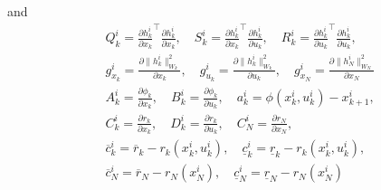 \documentclass{article}
\newcommand{\norm}[1]{\lVert#1\rVert}
\begin{document}
and
\begin{equation}\label{QP data}
\begin{aligned}
&Q_k^i = \frac{\partial h_k^i}{\partial x_k}^\top \frac{\partial h_k^i}{\partial x_k},\quad S_k^i = \frac{\partial h_k^i}{\partial x_k}^\top \frac{\partial h_k^i}{\partial u_k},\quad R_k^i = \frac{\partial h_k^i}{\partial u_k}^\top \frac{\partial h_k^i}{\partial u_k},\\
&g_{x_k}^i = \frac{\partial \norm{h_k^i}_{W_k}^2}{\partial x_k},\quad g_{u_k}^i = \frac{\partial \norm{h_k^i}_{W_k}^2}{\partial u_k},\quad g_{x_N}^i = \frac{\partial \norm{h_N^i}_{W_N}^2}{\partial x_N}\\
&A_k^i=\frac{\partial \phi_k}{\partial x_k}, \quad B_k^i=\frac{\partial \phi_k}{\partial u_k},\quad a_k^i = \phi(x_k^i,u_k^i)-x_{k+1}^i,\\
&C_k^i=\frac{\partial r_k}{\partial x_k}, \quad D_k^i=\frac{\partial r_k}{\partial u_k},\quad C_N^i=\frac{\partial r_N}{\partial x_N},\\
&\overline{c}_k^i=\overline{r}_k-r_k(x_k^i,u_k^i),\quad  \underline{c}_k^i=\underline{r}_k-r_k(x_k^i,u_k^i),\\
&\overline{c}_N^i=\overline{r}_N-r_N(x_N^i),\quad  \underline{c}_N^i=\underline{r}_N-r_N(x_N^i)
\end{aligned}
\end{equation}
\end{document}
